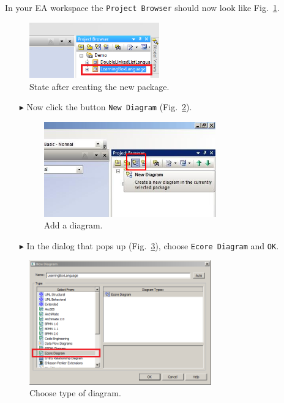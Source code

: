 In your EA workspace the \texttt{Project Browser} should now look like Fig.~\ref{fig:new_package_completed}.
\begin{figure}[htbp]
	\centering
  \includegraphics[width=0.5\textwidth]{pics/memBoxBilder/memBox03.png}
	\caption{State after creating the new package.}
	\label{fig:new_package_completed}
\end{figure} 

\begin{enumerate}
\item[$\blacktriangleright$] Now click the button \texttt{New Diagram} (Fig.~\ref{fig:diagram}).


\begin{figure}[htbp]
	\centering
  \includegraphics[width=0.7\textwidth]{pics/memBoxBilder/memBox04.png}
	\caption{Add a diagram.}
	\label{fig:diagram}
\end{figure}

\item[$\blacktriangleright$] In the dialog that pops up (Fig.~\ref{fig:diagram_type}), choose \texttt{Ecore Diagram} and  \texttt{OK}. 
\end{enumerate}

\begin{figure}[htbp]
	\centering
  \includegraphics[width=0.7\textwidth]{pics/memBoxBilder/memBox05.png}
	\caption{Choose type of diagram.}
	\label{fig:diagram_type}
\end{figure}

